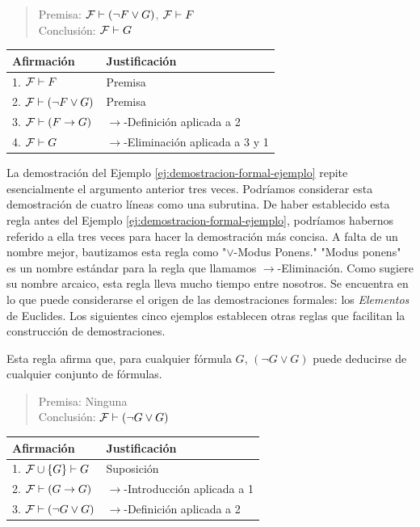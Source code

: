 \documentclass[12pt,a4paper]{book}
\makeatletter
\newcommand{\comillas}[1]{"#1"}
\newenvironment{derivacion}{%
  \begingroup
  \renewcommand{\arraystretch}{1.35}
  \begin{center}
  \begin{tabular}{@{}l l@{}}
    \textbf{Afirmación} & \textbf{Justificación}\\
    \hline
}{%
  \end{tabular}
  \end{center}
  \endgroup
}
\makeatother
\begin{document}
    \begin{quote}
        Premisa: $\mathcal{F}\vdash(\neg F\vee G)$, $\mathcal{F}\vdash F$\\
        Conclusión: $\mathcal{F}\vdash G$
    \end{quote}

    \begin{derivacion}
        1. $\mathcal{F}\vdash F$ & Premisa\\
        2. $\mathcal{F}\vdash(\neg F\vee G)$ & Premisa\\
        3. $\mathcal{F}\vdash(F\rightarrow G)$ & $\rightarrow$-Definición aplicada a 2\\
        4. $\mathcal{F}\vdash G$ & $\rightarrow$-Eliminación aplicada a 3 y 1\\
    \end{derivacion}

    La demostración del Ejemplo \ref{ej:demostracion-formal-ejemplo} repite esencialmente el argumento anterior tres veces.
    Podríamos considerar esta demostración de cuatro líneas como una subrutina. De haber establecido esta regla antes del
    Ejemplo \ref{ej:demostracion-formal-ejemplo}, podríamos habernos referido a ella tres veces para hacer la demostración más
    concisa. A falta de un nombre mejor, bautizamos esta regla como \comillas{$\vee$-Modus Ponens.} \comillas{Modus ponens} es un
    nombre estándar para la regla que llamamos $\rightarrow$-Eliminación. Como sugiere su nombre arcaico, esta regla lleva mucho
    tiempo entre nosotros. Se encuentra en lo que puede considerarse el origen de las demostraciones formales: los
    \textit{Elementos} de Euclides. Los siguientes cinco ejemplos establecen otras reglas que facilitan la construcción de
    demostraciones.

    \begin{ejemplo}\label{ej:regla-tautologia}
        Esta regla afirma que, para cualquier fórmula $G$, $(\neg G\vee G)$ puede deducirse de cualquier conjunto de fórmulas.

        \begin{quote}
            Premisa: Ninguna\\
            Conclusión: $\mathcal{F}\vdash(\neg G\vee G)$
        \end{quote}

        \begin{derivacion}
            1. $\mathcal{F}\cup\{G\}\vdash G$ & Suposición\\
            2. $\mathcal{F}\vdash(G\rightarrow G)$ & $\rightarrow$-Introducción aplicada a 1\\
            3. $\mathcal{F}\vdash(\neg G\vee G)$ & $\rightarrow$-Definición aplicada a 2\\
        \end{derivacion}
    \end{ejemplo}
\end{document}
